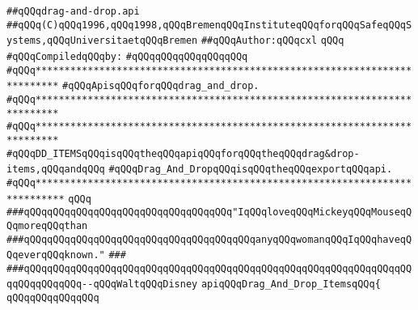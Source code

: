 \label{src/lib/tk/src/toolkit/drag-and-drop.api}
\verb|##qQQqdrag-and-drop.api|\newline
\verb|##qQQq(C)qQQq1996,qQQq1998,qQQqBremenqQQqInstituteqQQqforqQQqSafeqQQqSystems,qQQqUniversitaetqQQqBremen|\newline
\verb|##qQQqAuthor:qQQqcxl|\newline
\verb|qQQq|\newline
\verb|#qQQqCompiledqQQqby:|\newline
\verb|#qQQqqQQqqQQqqQQqqQQq|\newline
\newline
\newline
\newline
\verb|#qQQq**************************************************************************|\newline
\verb|#qQQqApisqQQqforqQQqdrag_and_drop.|\newline
\verb|#qQQq**************************************************************************|\newline
\verb|#qQQq**************************************************************************|\newline
\verb|#qQQqDD_ITEMSqQQqisqQQqtheqQQqapiqQQqforqQQqtheqQQqdrag&drop-items,qQQqandqQQq|\newline
\verb|#qQQqDrag_And_DropqQQqisqQQqtheqQQqexportqQQqapi.|\newline
\verb|#qQQq***************************************************************************|\newline
\newline
\verb|qQQq|\newline
\newline
\verb|###qQQqqQQqqQQqqQQqqQQqqQQqqQQqqQQqqQQq"IqQQqloveqQQqMickeyqQQqMouseqQQqmoreqQQqthan|\newline
\verb|###qQQqqQQqqQQqqQQqqQQqqQQqqQQqqQQqqQQqqQQqanyqQQqwomanqQQqIqQQqhaveqQQqeverqQQqknown."|\newline
\verb|###|\newline
\verb|###qQQqqQQqqQQqqQQqqQQqqQQqqQQqqQQqqQQqqQQqqQQqqQQqqQQqqQQqqQQqqQQqqQQqqQQqqQQqqQQq--qQQqWaltqQQqDisney|\newline
\newline
\newline
\newline
\verb|apiqQQqDrag_And_Drop_ItemsqQQq{|\newline
\verb|qQQqqQQqqQQqqQQq|\newline
